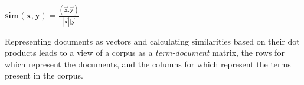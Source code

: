 \begin{center}
    $\mathbf{sim(x, y)} = \frac{(\vec{\mathbf{x}} . \vec{\mathbf{y}})}{|\vec{\mathbf{x}}| | \vec{\mathbf{y}}}$
\end{center}

Representing documents as vectors and calculating similarities based on their dot products leads to a view of a corpus as a \emph{term-document} matrix, the rows for which represent the documents, and the columns for which represent the terms present in the corpus.
